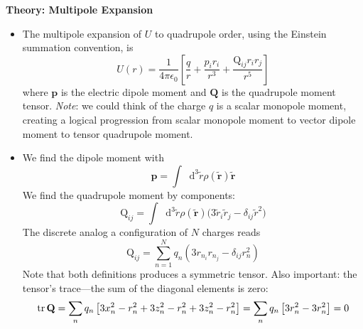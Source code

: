 \documentclass[11pt, a4paper]{article}
\newcommand{\diff}{\mathop{}\!\mathrm{d}} %
\renewcommand{\vec}[1]{\bm{#1}} %
\newcommand{\mat}[1]{\mathbf{#1}} %
\newcommand{\tvec}[1]{\tilde{\vec{#1}}} %
\newcommand{\e}{\epsilon_{0}}  %
\begin{document}
\textbf{Theory: Multipole Expansion}
\begin{itemize}

	\item The multipole expansion of $ U $ to quadrupole order, using the Einstein summation convention, is
	\begin{equation*}
		U(r) = \frac{1}{4\pi \e} \left[\frac{q}{r} + \frac{p_{i}r_{i}}{r^{3}} + \frac{\mathrm{Q}_{ij}r_{i}r_{j}}{r^{5}} \right]
	\end{equation*}
	where $ \vec{p} $ is the electric dipole moment and $ \mat{Q} $ is the quadrupole moment tensor. \textit{Note}: we could think of the charge $ q $ is a scalar monopole moment, creating a logical progression from scalar monopole moment to vector dipole moment to tensor quadrupole moment. 
	
	\item We find the dipole moment with 
	\begin{equation*}
		\vec{p} = \int  \diff^{3} \tilde{r} \rho(\tvec{r}) \tvec{r}
	\end{equation*}
	We find the quadrupole moment by components:
	\begin{equation*}
		\mathrm{Q}_{ij} = \int  \diff^{3} \tilde{r} \rho(\tvec{r}) \big( 3\tilde{r}_{i}\tilde{r}_{j} - \delta_{ij}\tilde{r}^{2} \big)
	\end{equation*}
	The discrete analog a configuration of $ N $ charges reads
	\begin{equation*}
		\mathrm{Q}_{ij} = \sum_{n=1}^{N} q_{n} \left(3r_{n_{i}}r_{n_{j}} - \delta_{ij}r_{n}^{2}\right)
	\end{equation*}
	Note that both definitions produces a symmetric tensor. Also important: the tensor's trace---the sum of the diagonal elements is zero:
	\begin{equation*}
		\tr\mat{Q} = \sum_{n} q_{n}\left[3x_{n}^{2} - r_{n}^{2} + 3z_{n}^{2} - r_{n}^{2} + 3z_{n}^{2} - r_{n}^{2} \right] = \sum_{n}q_{n}\left[3r_{n}^{2} - 3r_{n}^{2}\right] = 0
	\end{equation*}
\end{itemize}
\end{document}
